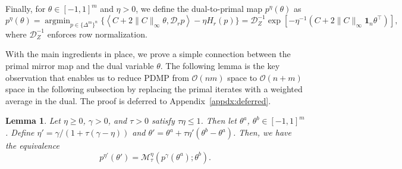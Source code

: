 \documentclass[10pt]{article}
\DeclareMathOperator*{\argmin}{argmin}
\newcommand{\inner}[2]{\left\langle #1,#2\right\rangle}
\newcommand{\diag}[1]{\mathcal{D}_{#1}}
\theoremstyle{plain}
\newtheorem{lemma}[theorem]{Lemma}
\theoremstyle{definition}
\theoremstyle{remark}
\newcommand{\one}{\mathbf{1}}
\begin{document}
    Finally, for $\theta\in[-1,1]^m$ and $\eta>0$, we define the dual-to-primal map $p^\eta(\theta)$ as
\begin{equation}\label{def:dual_to_primal}
    p^\eta(\theta)=\argmin_{p\in\{\Delta^m\}^n}\{\inner{C + 2\|C\|_\infty\theta}{\diag{r}p}-\eta H_r(p)\}= \diag{Z}^{-1} \exp[-\eta^{-1}(C+2\|C\|_\infty\one_n\theta^\top)],
\end{equation}
where $\diag{Z}^{-1}$ enforces row normalization.


With the main ingredients in place, we prove a simple connection between the primal mirror map and the dual variable $\theta$. The following lemma is the key observation that enables us to reduce PDMP from $\mathcal{O}(nm)$ space to $\mathcal{O}(n+m)$ space in the following subsection by replacing the primal iterates with a weighted average in the dual. The proof is deferred to Appendix~\ref{appdx:deferred}.
\begin{lemma}\label{lem:primal_md_eq_dual_avg}
    Let $\eta\geq 0$, $\gamma>0$, and $\tau>0$ satisfy $\tau\eta\leq 1$. Then let $\theta^a$, $\theta^b\in [-1,1]^m$. Define $\eta'=\gamma / (1+\tau(\gamma-\eta ))$ and $\theta'=\theta^a + \tau\eta'(\theta^b-\theta^a)$. Then, we have the equivalence
    \begin{equation}\label{eq:mirror_map_id}
        p^{\eta'}(\theta')=\mathcal{M}^\eta_{\tau}(p^\gamma(\theta^a);\theta^b).
    \end{equation}
\end{lemma}

\end{document}
